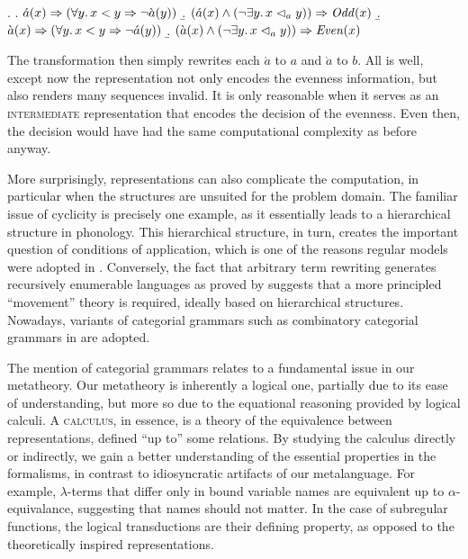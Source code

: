 \documentclass[12pt, a4paper]{report}
\newcommand{\textemph}[1]{\textsc{#1}}
\newcommand{\textterm}[1]{\textsc{#1}\index{#1}}
\renewcommand{\implies}{\Rightarrow}
\begin{document}
\ex.
\a. \(\acute{a}(x) \implies (\forall y\ldotp x < y \implies
\neg\grave{a}(y))\)
\b. \((\acute{a}(x) \land
(\neg\exists y\ldotp x \vartriangleleft_{a} y))
\implies \mathit{Odd}(x)\)
\b. \(\grave{a}(x) \implies (\forall y\ldotp x < y \implies
\neg\acute{a}(y))\)
\b. \((\grave{a}(x) \land
(\neg\exists y\ldotp x \vartriangleleft_{a} y))
\implies \mathit{Even}(x)\)

The transformation then simply rewrites each \(\acute{a}\) to \(a\)
and \(\grave{a}\) to \(b\).  All is well, except now the
representation not only encodes the evenness information, but also
renders many sequences invalid.  It is only reasonable when it serves
as an \textemph{intermediate} representation that encodes the decision
of the evenness.  Even then, the decision would have had the same
computational complexity as before anyway.

More surprisingly, representations can also complicate the
computation, in particular when the structures are unsuited for the
problem domain.  The familiar issue of cyclicity is precisely one
example, as it essentially leads to a hierarchical structure in
phonology.  This hierarchical structure, in turn, creates the
important question of conditions of application, which is one of the
reasons regular models were adopted in \textcite{kk94rmprs}.
Conversely, the fact that arbitrary term rewriting generates
recursively enumerable languages as proved by \textcite{pr73gptg}
suggests that a more principled \enquote{movement} theory is required,
ideally based on hierarchical structures.  Nowadays, variants of
categorial grammars such as combinatory categorial grammars in
\textcite{s00sp} are adopted.

The mention of categorial grammars relates to a fundamental issue in
our metatheory.  Our metatheory is inherently a logical one, partially
due to its ease of understanding, but more so due to the equational
reasoning provided by logical calculi.  A \textterm{calculus}, in
essence, is a theory of the equivalence between representations,
defined \enquote{up to} some relations.  By studying the calculus
directly or indirectly, we gain a better understanding of the
essential properties in the formalisms, in contrast to idiosyncratic
artifacts of our metalanguage.  For example, \(\lambda\)-terms that
differ only in bound variable names are equivalent up to
\(\alpha\)-equivalance, suggesting that names should not matter.  In
the case of subregular functions, the logical transductions are their
defining property, as opposed to the theoretically inspired
representations.
\end{document}
